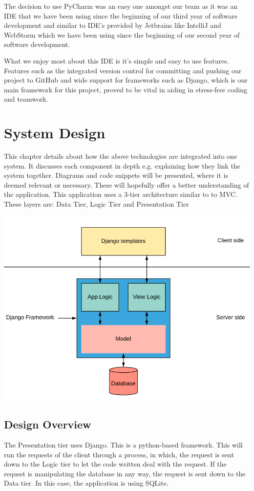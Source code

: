 The decision to use PyCharm was an easy one amongst our team as it was an IDE that we have been using since the beginning of our third year of software development and similar to IDE's provided by Jetbrains like IntelliJ and WebStorm which we have been using since the beginning of our second year of software development. 

What we enjoy most about this IDE is it's simple and easy to use features\cite{pycharm}. Features such as the integrated version control for committing and pushing our project to GitHub and wide support for frameworks such as Django, which is our main framework for this project, proved to be vital in aiding in stress-free coding and teamwork.

\chapter{System Design}
This chapter details about how the above technologies are integrated into one system. It discusses each component in depth e.g. explaining how they link the system together. Diagrams and code snippets will be presented, where it is deemed relevant or necessary. These will hopefully offer a better understanding of the application. This application uses a 3-tier architecture similar to to MVC. These layers are: Data Tier, Logic Tier and Presentation Tier

\includegraphics[scale=0.4]{img/uml.png}

\section{Design Overview}
The Presentation tier uses Django. This is a python-based framework. This will run the requests of the client through a process, in which, the request is sent down to the Logic tier to let the code written deal with the request. If the request is manipulating the database in any way, the request is sent down to the Data tier. In this case, the application is using SQLite.
